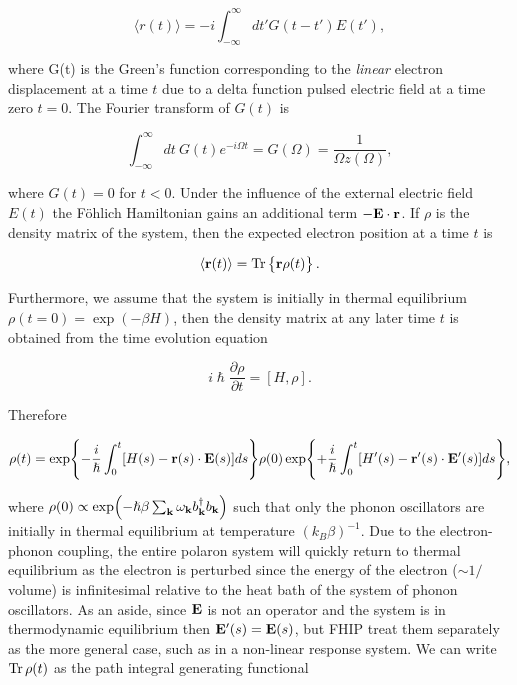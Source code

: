 \begin{equation}
    \langle r(t) \rangle = -i \int^\infty_{-\infty} dt' G(t - t') E(t') ,
\end{equation}

where G(t) is the Green's function corresponding to the \emph{linear} electron displacement at a time $t$ due to a delta function pulsed electric field at a time zero $t = 0$. The Fourier transform of $G(t)$ is

\begin{equation}
    \int^\infty_{-\infty} dt\ G(t) e^{-i\Omega t} = G(\Omega) = \frac{1}{\Omega z(\Omega)},
\end{equation}

where $G(t) = 0$ for $t < 0$. Under the influence of the external electric field $E(t)$ the F\"ohlich Hamiltonian gains an additional term $- \vb{E} \cdot \vb{r}$. If $\rho$ is the density matrix of the system, then the expected electron position at a time $t$ is

\begin{equation}
    \langle \vb{r}(t) \rangle = \Tr \left\{ \vb{r} \rho(t) \right\}.
\end{equation}

Furthermore, we assume that the system is initially in thermal equilibrium $\rho(t = 0) = \exp(-\beta H)$, then the density matrix at any later time $t$ is obtained from the time evolution equation

\begin{equation}
    i\hslash \frac{\partial \rho}{\partial t} = [H, \rho].
\end{equation}

Therefore

\begin{equation}
    \rho(t) = \exp{-\frac{i}{\hslash}\int^{t}_0 [H(s)- \vb{r}(s)\cdot\vb{E}(s)] ds} \rho(0) \exp{+\frac{i}{\hslash}\int^t_0 [H'(s) - \vb{r'}(s)\cdot\vb{E'}(s)] ds},
\end{equation}

where $\rho(0) \propto \exp(-\hslash \beta \sum_{\vb{k}} \omega_{\vb{k}} b^\dagger_{\vb{k}} b_{\vb{k}})$ such that only the phonon oscillators are initially in thermal equilibrium at temperature $(k_B \beta)^{-1}$. Due to the electron-phonon coupling, the entire polaron system will quickly return to thermal equilibrium as the electron is perturbed since the energy of the electron ($\sim 1/$volume) is infinitesimal relative to the heat bath of the system of phonon oscillators. As an aside, since $\vb{E}$ is not an operator and the system is in thermodynamic equilibrium then $\vb{E'}(s) = \vb{E}(s)$, but FHIP treat them separately as the more general case, such as in a non-linear response system. We can write $\Tr \rho(t)$ as the path integral generating functional

